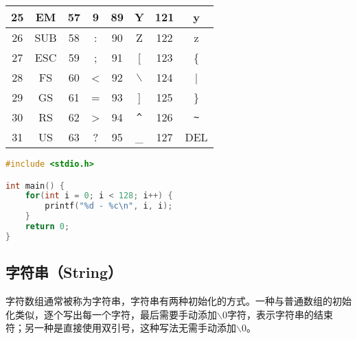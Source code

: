 \begin{longtable}{|c|c|c|c|c|c|c|c|}
	\hline
	25             & EM            & 57             & 9             & 89             & Y                      & 121            & y                      \\
	\hline
	26             & SUB           & 58             & :             & 90             & Z                      & 122            & z                      \\
	\hline
	27             & ESC           & 59             & ;             & 91             & [                      & 123            & \{                     \\
			\hline
	28             & FS            & 60             & <             & 92             & $ \backslash $         & 124            & |                      \\
			\hline
	29             & GS            & 61             & =             & 93             & ]                      & 125            & \}                     \\
	\hline
	30             & RS            & 62             & >             & 94             & \lstinline|^| & 126            & \lstinline|~| \\
	\hline
	31             & US            & 63             & ?             & 95             & \_                     & 127            & DEL                    \\
	\hline
\end{longtable}

\vspace{0.5cm}


\begin{lstlisting}[language=C]
#include <stdio.h>

int main() {
	for(int i = 0; i < 128; i++) {
		printf("%d - %c\n", i, i);
	}
	return 0;
}
\end{lstlisting}

\vspace{0.5cm}

\subsection{字符串（String）}

字符数组通常被称为字符串，字符串有两种初始化的方式。一种与普通数组的初始化类似，逐个写出每一个字符，最后需要手动添加$ \backslash $0字符，表示字符串的结束符；另一种是直接使用双引号，这种写法无需手动添加$ \backslash $0。

\vspace{-0.5cm}

